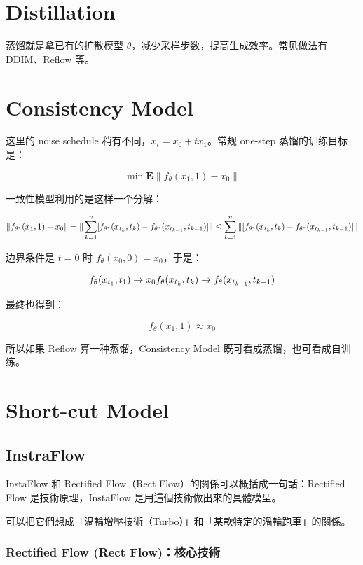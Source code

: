 \section{Distillation}

蒸馏就是拿已有的扩散模型 \(\theta\)，减少采样步数，提高生成效率。常见做法有 DDIM、Reflow 等。

\section{Consistency Model}

这里的 noise schedule 稍有不同，\(x_t=x_0+tx_1\)。常规 one-step 蒸馏的训练目标是：

\[
\min \mathbf{E}\|f_{\theta}(x_1,1)-x_0\|
\]

一致性模型利用的是这样一个分解：

\[
\|f_{\theta^*}(x_1,1)-x_0\|=\|\large\sum_{k=1}^{n}[f_{\theta^*}(x_{t_k},t_k)-f_{\theta^*}(x_{t_{k-1}},t_{k-1})]\|
\le \large\sum_{k=1}^{n}\|[f_{\theta^*}(x_{t_k},t_k)-f_{\theta^*}(x_{t_{k-1}},t_{k-1})]\|
\]

边界条件是 \(t=0\) 时 \(f_\theta(x_0,0)=x_0\)，于是：

\[
f_\theta(x_{t_1},t_1) \to x_0 \\
f_\theta(x_{t_k},t_k) \to f_\theta(x_{t_{k-1}},t_{k-1})
\]

最终也得到：

\[
f_\theta(x_1,1) \approx x_0
\]

所以如果 Reflow 算一种蒸馏，Consistency Model 既可看成蒸馏，也可看成自训练。

\section{Short-cut Model}

\subsection{InstraFlow}

InstaFlow 和 Rectified Flow（Rect Flow）的關係可以概括成一句話：Rectified Flow 是技術原理，InstaFlow 是用這個技術做出來的具體模型。

可以把它們想成「渦輪增壓技術（Turbo）」和「某款特定的渦輪跑車」的關係。

\subsubsection{Rectified Flow (Rect Flow)：核心技術}

